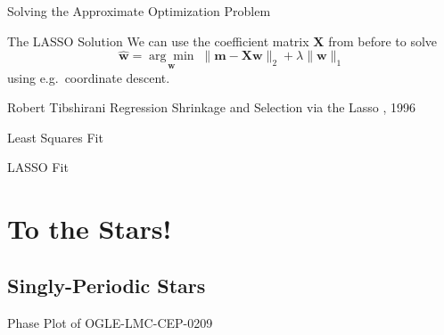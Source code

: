 \documentclass[serif,mathserif,professionalfont]{beamer}
\begin{document}
\begin{frame}{Solving the Approximate Optimization Problem}
\begin{block}{The LASSO Solution}
We can use the coefficient matrix $\mathbf X$ from before to solve
$$\mathbf{\hat w} = \underset{\mathbf w}{\arg\min} \; \| \mathbf {m} - \mathbf {X} \mathbf {w} \|_2 + \lambda \| \mathbf{w} \|_1$$
using e.g.~coordinate descent.%
\end{block}
\vspace{5mm}
\begin{thebibliography}{1}
  \beamertemplatearticlebibitems
    Robert Tibshirani
    \newblock Regression Shrinkage and Selection via the Lasso
    , 1996
\end{thebibliography}
\end{frame}

\begin{frame}{Least Squares Fit}
\begin{figure}
\centering

\end{figure} 
\end{frame}

\begin{frame}{LASSO Fit}
\begin{figure}
\centering

\end{figure} 
\end{frame}

\section{To the Stars!}
\subsection{Singly-Periodic Stars}
\begin{frame}{Phase Plot of OGLE-LMC-CEP-0209}
\makebox[\textwidth][c]{}
\end{frame}
\end{document}
